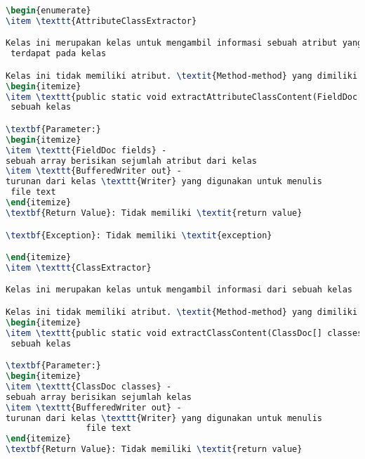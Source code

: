 \begin{lstlisting}[language=TeX, caption=Hasil Pengujian kode program perangkat lunak]
\begin{enumerate}
\item \texttt{AttributeClassExtractor}

Kelas ini merupakan kelas untuk mengambil informasi sebuah atribut yang
 terdapat pada kelas

Kelas ini tidak memiliki atribut. \textit{Method-method} yang dimiliki kelas ini adalah sebagai berikut.
\begin{itemize}
\item \texttt{public static void extractAttributeClassContent(FieldDoc[] fields, java.io.BufferedWriter out)}\textit{Method} ini akan menampilkan atribut-atribut yang dimiliki oleh
 sebuah kelas

\textbf{Parameter:}
\begin{itemize}
\item \texttt{FieldDoc fields} - 
sebuah array berisikan sejumlah atribut dari kelas
\item \texttt{BufferedWriter out} - 
turunan dari kelas \texttt{Writer} yang digunakan untuk menulis
 file text
\end{itemize}
\textbf{Return Value}: Tidak memiliki \textit{return value}

\textbf{Exception}: Tidak memiliki \textit{exception}

\end{itemize}
\item \texttt{ClassExtractor}

Kelas ini merupakan kelas untuk mengambil informasi dari sebuah kelas

Kelas ini tidak memiliki atribut. \textit{Method-method} yang dimiliki kelas ini adalah sebagai berikut.
\begin{itemize}
\item \texttt{public static void extractClassContent(ClassDoc[] classes, java.io.BufferedWriter out)}\textit{Method} ini akan menampilkan nama kelas berserta penjelasan dari
 sebuah kelas

\textbf{Parameter:}
\begin{itemize}
\item \texttt{ClassDoc classes} - 
sebuah array berisikan sejumlah kelas
\item \texttt{BufferedWriter out} - 
turunan dari kelas \texttt{Writer} yang digunakan untuk menulis
                file text
\end{itemize}
\textbf{Return Value}: Tidak memiliki \textit{return value}


\end{lstlisting}

